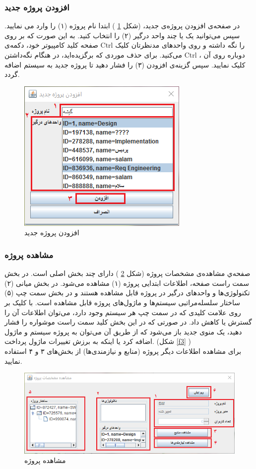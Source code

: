 \subsubsection{افزودن پروژه جدید}

در صفحه‌ی افزودن پروژه‌ی جدید، (شکل
\ref{f1}
)
ابتدا نام پروژه (۱) را وارد می نمایید. سپس می‌توانید  یک یا چند واحد درگیر (۲) را انتخاب کنید. به این صورت که بر روی صفحه کلید کامپیوتر خود، دکمه‌ی Ctrl را نگه داشته و روی واحدهای مدنظرتان کلیک می‌کنید. برای حذف موردی که برگزیده‌اید، در هنگام نگه‌داشتن Ctrl ، دوباره روی آن کلیک نمایید. سپس گزینه‌ی افزودن (۳) را فشار دهید تا پروژه جدید به سیستم اضافه گردد.

\begin{figure}[H]
	\centering
	\includegraphics[scale=0.8]{img/manual/addProject}
	\caption{افزودن پروژه جدید}
	\label{f1}
\end{figure}

\subsubsection{مشاهده پروژه}
صفحه‌ي مشاهده‌ی مشخصات پروژه (شکل
\ref{f2}
)
دارای چند بخش اصلی است. در بخش سمت راست صفحه، اطلاعات ابتدایی پروژه (۱) مشاهده می‌شود. در بخش میانی (۲) تکنولوژی‌ها و واحدهای درگیر در پروژه قابل مشاهده هستند و در بخش سمت چپ (۵) ساختار سلسله‌مراتبی سیستم‌ها و ماژول‌های پروژه قابل مشاهده است. با کلیک بر روی علامت کلیدی که در سمت چپ هر سیستم وجود دارد، می‌توان اطلاعات آن را گسترش یا کاهش داد. در صورتی که در این بخش کلید سمت راست موشواره را فشار دهید، یک منوی جدید باز می‌شود که از طریق آن می‌توان به پروژه سیستم و ماژول اضافه کرد یا اینکه به برزش تغییرات ماژول پرداخت. (شکل
\ref{f3}
) \\
برای مشاهده اطلاعات دیگر پروژه (منابع و نیازمندی‌ها) از بخش‌های ۳ و ۴ استفاده نمایید.
\begin{figure}[H]
	\centering
	\includegraphics[scale=0.8]{img/manual/projectAttr}
	\caption{مشاهده پروژه}
	\label{f2}
	\end{figure}	

